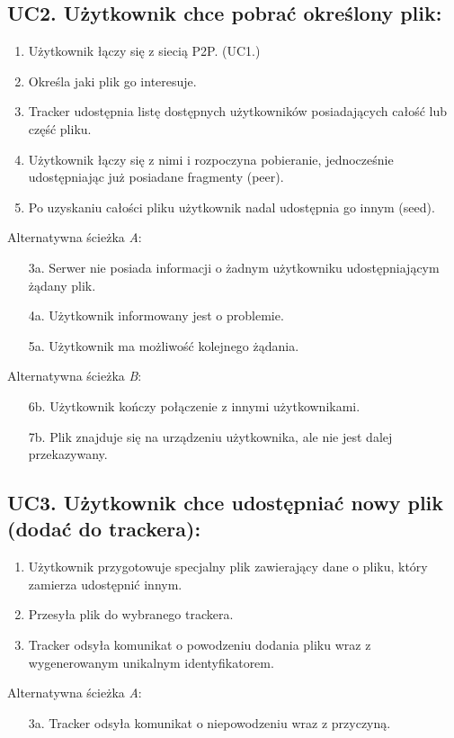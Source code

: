 \documentclass[11pt]{article}
\begin{document}
\subsection{UC2. Użytkownik chce pobrać określony plik:}
\begin{enumerate}
	\item Użytkownik łączy się z siecią P2P. (UC1.)
	\item Określa jaki plik go interesuje.
	\item Tracker udostępnia listę dostępnych użytkowników posiadających całość lub część pliku.
	\item Użytkownik łączy się z nimi i rozpoczyna pobieranie, jednocześnie udostępniając już posiadane fragmenty (peer).
	\item Po uzyskaniu całości pliku użytkownik nadal udostępnia go innym (seed).

\end{enumerate}
Alternatywna ścieżka \textsl{A}:
\begin{itemize}
	\item [3a.] Serwer nie posiada informacji o żadnym użytkowniku udostępniającym żądany plik.
	\item [4a.] Użytkownik informowany jest o problemie.
	\item [5a.] Użytkownik ma możliwość kolejnego żądania.
\end{itemize}
Alternatywna ścieżka \textsl{B}:
\begin{itemize}
	\item [6b.] Użytkownik kończy połączenie z innymi użytkownikami.
	\item [7b.] Plik znajduje się na urządzeniu użytkownika, ale nie jest dalej przekazywany.
\end{itemize}
\subsection{UC3. Użytkownik chce udostępniać nowy plik (dodać do trackera):}
\begin{enumerate}
	\item Użytkownik przygotowuje specjalny plik zawierający dane o pliku, który zamierza udostępnić innym.
	\item Przesyła plik do wybranego trackera.
	\item Tracker odsyła komunikat o powodzeniu dodania pliku wraz z wygenerowanym unikalnym identyfikatorem.
\end{enumerate}
Alternatywna ścieżka \textsl{A}:
\begin{itemize}
	\item [3a.] Tracker odsyła komunikat o niepowodzeniu wraz z przyczyną.
\end{itemize}
\end{document}
